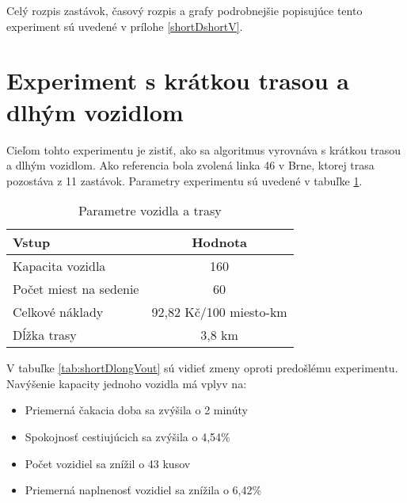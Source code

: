Celý rozpis zastávok, časový rozpis a grafy podrobnejšie popisujúce tento experiment sú uvedené v prílohe \ref{shortDshortV}.

\newpage

\section{Experiment s krátkou trasou a dlhým vozidlom}
Cieľom tohto experimentu je zistiť, ako sa algoritmus vyrovnáva s krátkou trasou a dlhým vozidlom.
Ako referencia bola zvolená linka 46 v Brne, ktorej trasa pozostáva z 11 zastávok.
Parametry experimentu sú uvedené v tabuľke \ref{tab:shortDlongVin}.

\begin{table}[h]
  \centering
  \begin{tabular}{|l|c|}
    \hline
    \textbf{Vstup} & \textbf{Hodnota} \\ \hline
    Kapacita vozidla & 160 \\ \hline
    Počet miest na sedenie & 60 \\ \hline
    Celkové náklady & 92,82 Kč/100 miesto-km \\ \hline
    Dĺžka trasy & 3,8 km \\ \hline
  \end{tabular}
  \caption{Parametre vozidla a trasy}
  \label{tab:shortDlongVin}
\end{table}

V tabuľke \ref{tab:shortDlongVout} sú vidieť zmeny oproti predošlému experimentu.
Navýšenie kapacity jednoho vozidla má vplyv na:
\begin{itemize}
  \item Priemerná čakacia doba sa zvýšila o 2 minúty
  \item Spokojnosť cestiujúcich sa zvýšila o 4,54\%
  \item Počet vozidiel sa znížil o 43 kusov
  \item Priemerná naplnenosť vozidiel sa znížila o 6,42\%
\end{itemize}

